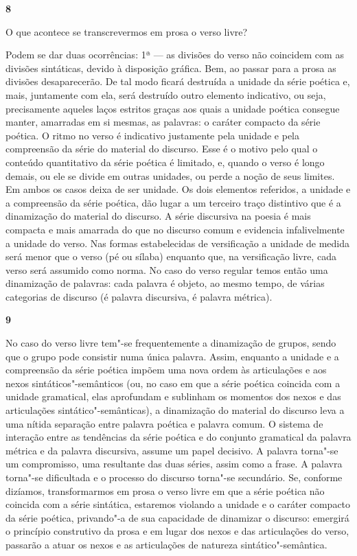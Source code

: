 \textbf{8}

O que acontece se transcrevermos em prosa o verso livre?

Podem se dar duas ocorrências: 1ª --- as divisões do verso não coincidem
com as divisões sintáticas, devido à disposição gráfica. Bem, ao passar
para a prosa as divisões desaparecerão. De tal modo ficará destruída a
unidade da série poética e, mais, juntamente com ela, será destruído
outro elemento indicativo, ou seja, precisamente aqueles laços estritos
graças aos quais a unidade poética consegue manter, amarradas em si
mesmas, as palavras: o caráter compacto da série poética. O ritmo no
verso é indicativo justamente pela unidade e pela compreensão da série
do material do discurso. Esse é o motivo pelo qual o conteúdo
quantitativo da série poética é limitado, e, quando o verso é longo
demais, ou ele se divide em outras unidades, ou perde a noção de seus
limites. Em ambos os casos deixa de ser unidade. Os dois elementos
referidos, a unidade e a compreensão da série poética, dão lugar a um
terceiro traço distintivo que é a dinamização do material do discurso. A
série discursiva na poesia é mais compacta e mais amarrada do que no
discurso comum e evidencia infalivelmente a unidade do verso. Nas formas
estabelecidas de versificação a unidade de medida será menor que o verso
(pé ou sílaba) enquanto que, na versificação livre, cada verso será
assumido como norma. No caso do verso regular temos então uma
dinamização de palavras: cada palavra é objeto, ao mesmo tempo, de
várias categorias de discurso (é palavra discursiva, é palavra métrica).

\textbf{9}

No caso do verso livre tem"-se frequentemente a dinamização de grupos,
sendo que o grupo pode consistir numa única palavra. Assim, enquanto a
unidade e a compreensão da série poética impõem uma nova ordem às
articulações e aos nexos sintáticos"-semânticos (ou, no caso em que a
série poética coincida com a unidade gramatical, elas aprofundam e
sublinham os momentos dos nexos e das articulações sintático"-semânticas), a dinamização do material do discurso leva a uma nítida
separação entre palavra poética e palavra comum. O sistema de interação
entre as tendências da série poética e do conjunto gramatical da palavra
métrica e da palavra discursiva, assume um papel decisivo. A palavra
torna"-se um compromisso, uma resultante das duas séries, assim como a
frase. A palavra torna"-se dificultada e o processo do discurso torna"-se
secundário. Se, conforme dizíamos, transformarmos em prosa o verso livre
em que a série poética não coincida com a série sintática, estaremos
violando a unidade e o caráter compacto da série poética, privando"-a de
sua capacidade de dinamizar o discurso: emergirá o princípio construtivo
da prosa e em lugar dos nexos e das articulações do verso, passarão a
atuar os nexos e as articulações de natureza sintático"-semântica.


